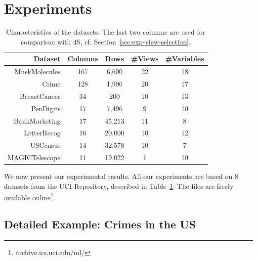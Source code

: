 \section{Experiments}
\label{sec:experiments}

\begin{table}
    \centering
    \small
    \begin{tabular}{r c c c c} 
        \hline
        Dataset & Columns & Rows & \#Views & \#Variables\\
        \hline
        MuskMolecules & 167 & 6,600 & 22 & 18\\
        Crime & 128 & 1,996 & 20 & 17\\
        BreastCancer & 34 & 200 & 10 & 13\\
        PenDigits & 17 & 7,496 & 9 & 10\\
        BankMarketing & 17 & 45,213 & 11& 8\\
        LetterRecog & 16 & 20,000 & 10 & 12\\
        USCensus & 14 & 32,578 & 10 & 7\\
        MAGICTelescope & 11 & 19,022 & 1 & 10\\
        \hline
    \end{tabular}
    \caption{Characteristics of the datasets. The last two columns are used for
    comparison with 4S, cf. Section~\ref{sec:exp-view-selection}.}
    \label{tab:datasets}
\end{table}
We now present our experimental results. All our experiments are based on 8
datasets from the UCI Repository, described in Table~\ref{tab:datasets}. The
files are freely available online\footnote{archive.ics.uci.edu/ml/}.

\subsection{Detailed Example: Crimes in the US}
\label{sec:crime}

